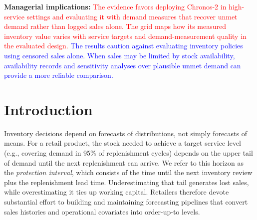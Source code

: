\documentclass[msom,dblanonrev]{informs4}
\newcommand{\add}[1]{\textcolor{blue}{#1}}
\newcommand{\reduce}[1]{\textcolor{red}{#1}\hspace{0.5em}}
\begin{document}
{%
\smallskip\noindent\textbf{Managerial implications:}
\reduce{The evidence favors deploying Chronos-2 in high-service settings and evaluating it with demand measures that recover unmet demand rather than logged sales alone.
The grid maps how its measured inventory value varies with service targets and demand-measurement quality in the evaluated design.}
\add{The results caution against evaluating inventory policies using censored sales alone. When sales may be limited by stock availability, availability records and sensitivity analyses over plausible unmet demand can provide a more reliable comparison.}
}




\maketitle

\section{Introduction}\label{sec:intro}

Inventory decisions depend on forecasts of distributions, not simply forecasts of means.
For a retail product, the stock needed to achieve a target service level (e.g., covering demand in 95\% of replenishment cycles) depends on the upper tail of demand until the next replenishment can arrive. We refer to this horizon as the \emph{protection interval}, which consists of the time until the next inventory review plus the replenishment lead time.
Underestimating that tail generates lost sales, while overestimating it ties up working capital.
Retailers therefore devote substantial effort to building and maintaining forecasting pipelines that convert sales histories and operational covariates into order-up-to levels.
\end{document}

